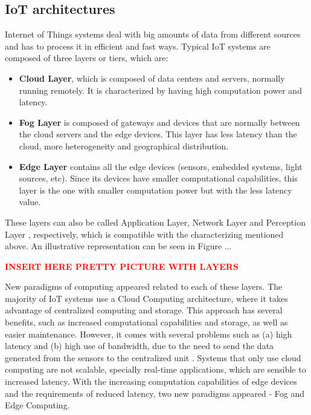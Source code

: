 \subsection{IoT architectures}\label{sec:architectures}

Internet of Things systems deal with big amounts of data from different sources and has to process it in efficient and fast ways. Typical IoT systems are composed of three layers or tiers, which are:

\begin{itemize}
    \item \textbf{Cloud Layer}, which is composed of data centers and servers, normally running remotely. It is characterized by having high computation power and latency.
    \item \textbf{Fog Layer} is composed of gateways and devices that are normally between the cloud servers and the edge devices. This layer has less latency than the cloud, more heterogeneity and geographical distribution.
    \item \textbf{Edge Layer} contains all the edge devices (sensors, embedded systems, light sources, etc). Since its devices have smaller computational capabilities, this layer is the one with smaller computation power but with the less latency value.
\end{itemize}

\par These layers can also be called Application Layer, Network Layer and Perception Layer \cite{iot_layers}, respectively, which is compatible with the characterizing mentioned above. An illustrative representation can be seen in Figure ...

\textcolor{red}{\textbf{INSERT HERE PRETTY PICTURE WITH LAYERS}}

\par New paradigms of computing appeared related to each of these layers. The majority of IoT systems use a Cloud Computing architecture, where it takes advantage of centralized computing and storage. This approach has several benefits, such as increased computational capabilities and storage, as well as easier maintenance. However, it comes with several problems such as (a) high latency and (b) high use of bandwidth, due to the need to send the data generated from the sensors to the centralized unit \cite{connecting_fog_and_cloud}. Systems that only use cloud computing are not scalable, specially real-time applications, which are sensible to increased latency. With the increasing computation capabilities of edge devices and the requirements of reduced latency, two new paradigms appeared - Fog and Edge Computing.

